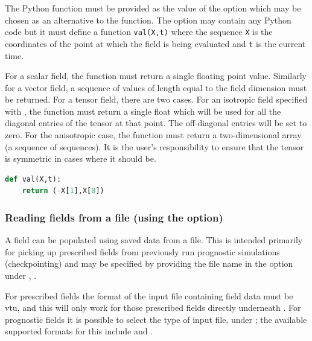 The Python function must be provided as the value of the
 option which may be chosen as an alternative to the
 function. The option may contain any Python code
but it must define a function \lstinline[language=Python]+val(X,t)+ where
the sequence \lstinline[language=Python]+X+ is the coordinates of the point
at which the field is being evaluated and \lstinline[language=Python]+t+ is
the current time.

For a scalar field, the function must return a single floating point
value. Similarly for a vector field, a sequence of values of length equal to
the field dimension must be returned. For a tensor field, there are two
cases. For an isotropic field specified with
, the function must return a single
float which will be used for all the diagonal entries of the tensor at that
point. The off-diagonal entries will be set to zero. For the anisotropic case,
the function must return a two-dimensional array (a sequence of
sequences). It is the user's responsibility to ensure that the tensor is
symmetric in cases where it should be.

\begin{example}
  \begin{lstlisting}[language=Python]
def val(X,t):
    return (-X[1],X[0])
  \end{lstlisting}
  \caption{A Python function returning a two-dimensional solid rotating
    vector field about the origin.}
\end{example}

\subsubsection{Reading fields from a file (using the  option)}
A field can be populated using saved data from a file. This is intended primarily
for picking up prescribed fields from previously run prognostic simulations
(checkpointing) and may be specified by providing the file name in
the  option under ,
.

For prescribed fields the format of the input file containing field data must be
vtu, and this will only work for those prescribed fields directly underneath
. For prognostic fields it is possible to select
the type of input file, under ;
the available supported formats for this include  and .

